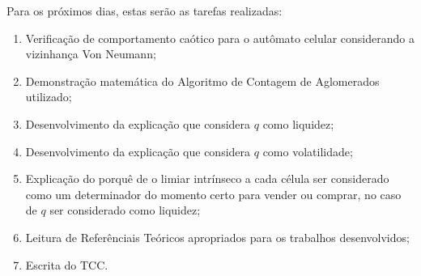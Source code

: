 \documentclass[12pt,a4paper,final]{article}
\begin{document}
  Para os próximos dias, estas serão as tarefas realizadas:
  \begin{enumerate}
    \item Verificação de comportamento caótico para o autômato celular considerando a vizinhança Von Neumann;
    \item Demonstração matemática do Algoritmo de Contagem de Aglomerados utilizado;
    \item Desenvolvimento da explicação que considera $q$ como liquidez;
    \item Desenvolvimento da explicação que considera $q$ como volatilidade;
    \item Explicação do porquê de o limiar intrínseco a cada célula ser considerado como um determinador do momento certo para vender ou comprar, no caso de $q$ ser considerado como liquidez;
    \item Leitura de Referênciais Teóricos apropriados para os trabalhos desenvolvidos;
    \item Escrita do TCC.
	\end{enumerate}
\end{document}

